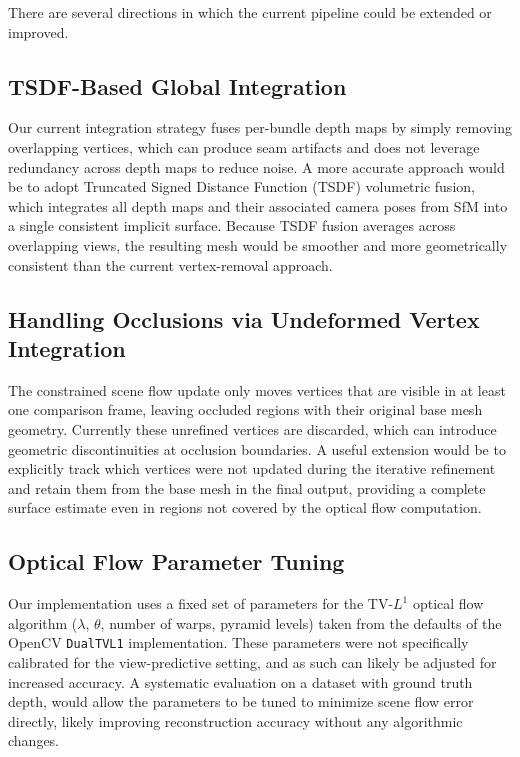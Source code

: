 \documentclass[10pt,twocolumn]{article}
\begin{document}
There are several directions in which the current pipeline could be extended 
or improved.

\subsection{TSDF-Based Global Integration}

Our current integration strategy fuses per-bundle depth maps by simply 
removing overlapping vertices, which can produce seam artifacts and does not 
leverage redundancy across depth maps to reduce noise. A more accurate 
approach would be to adopt Truncated Signed Distance Function (TSDF) 
volumetric fusion, which integrates all depth maps and their associated camera poses from SfM into a single consistent implicit surface. Because TSDF fusion  averages across overlapping views, the resulting mesh would be smoother and more geometrically consistent than the current vertex-removal approach.

\subsection{Handling Occlusions via Undeformed Vertex Integration}

The constrained scene flow update only moves vertices that are visible in at 
least one comparison frame, leaving occluded regions with their original base 
mesh geometry. Currently these unrefined vertices are discarded, which can introduce geometric discontinuities at occlusion boundaries. A useful extension would be to explicitly track which vertices were not updated during the iterative refinement and retain them from the base mesh in the final output, providing a complete surface estimate even in regions not covered by the optical flow computation.

\subsection{Optical Flow Parameter Tuning}

Our implementation uses a fixed set of parameters for the TV-$L^1$ optical 
flow algorithm ($\lambda$, $\theta$, number of warps, pyramid levels) taken 
from the defaults of the OpenCV \texttt{DualTVL1} implementation. These 
parameters were not specifically calibrated for the view-predictive setting, 
and as such can likely be adjusted for increased accuracy. A systematic evaluation on a dataset with ground truth depth, would allow the parameters to be tuned to minimize scene flow error directly, likely improving reconstruction accuracy without any algorithmic changes.
\end{document}
